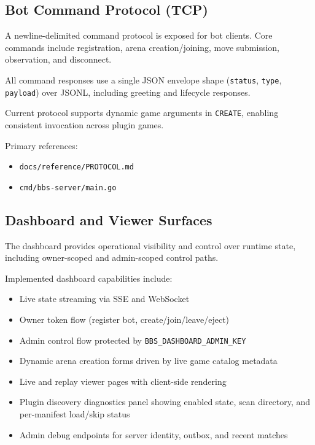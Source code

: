 \documentclass[11pt]{article}
\begin{document}
\subsection{Bot Command Protocol (TCP)}
A newline-delimited command protocol is exposed for bot clients. Core commands include registration, arena creation/joining, move submission, observation, and disconnect.

All command responses use a single JSON envelope shape (\texttt{status}, \texttt{type}, \texttt{payload}) over JSONL, including greeting and lifecycle responses.

Current protocol supports dynamic game arguments in \texttt{CREATE}, enabling consistent invocation across plugin games.

Primary references:
\begin{itemize}[leftmargin=*]
  \item \texttt{docs/reference/PROTOCOL.md}
  \item \texttt{cmd/bbs-server/main.go}
\end{itemize}

\subsection{Dashboard and Viewer Surfaces}
The dashboard provides operational visibility and control over runtime state, including owner-scoped and admin-scoped control paths.

Implemented dashboard capabilities include:
\begin{itemize}[leftmargin=*]
  \item Live state streaming via SSE and WebSocket
  \item Owner token flow (register bot, create/join/leave/eject)
  \item Admin control flow protected by \texttt{BBS\_DASHBOARD\_ADMIN\_KEY}
  \item Dynamic arena creation forms driven by live game catalog metadata
  \item Live and replay viewer pages with client-side rendering
  \item Plugin discovery diagnostics panel showing enabled state, scan directory, and per-manifest load/skip status
  \item Admin debug endpoints for server identity, outbox, and recent matches
\end{itemize}
\end{document}
